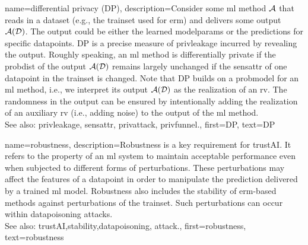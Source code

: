 {name={differential privacy (DP)},
  description={Consider some \gls{ml} method $\mathcal{A}$ 
  	that reads in a \gls{dataset} (e.g., the \gls{trainset} 
  	used for \gls{erm}) and delivers some output $\mathcal{A}(\mathcal{D})$. The output 
  	could be either the learned \glspl{modelparam} or the \glspl{prediction} for specific \glspl{datapoint}. 
  	DP is a precise measure of \gls{privleakage} incurred by revealing the 
  	output. Roughly speaking, an \gls{ml} method is differentially private if the \gls{probdist} 
  	of the output $\mathcal{A}(\mathcal{D})$ remains largely unchanged if the \gls{sensattr} 
  	of one \gls{datapoint} in the \gls{trainset} is changed. Note that DP 
  	builds on a \gls{probmodel} for an \gls{ml} method, i.e., we interpret its output $\mathcal{A}(\mathcal{D})$ 
  	as the \gls{realization} of an \gls{rv}. The randomness in the output can be ensured 
  	by intentionally adding the \gls{realization} of an auxiliary \gls{rv} (i.e., adding noise) to 
  	the output of the \gls{ml} method.
				\\ 
	See also: \gls{privleakage}, \gls{sensattr}, \gls{privattack}, \gls{privfunnel}.}, 
  first={DP}, 
  text={DP} 
}

{name={robustness},
	description={Robustness is a key requirement for \gls{trustAI}. It
		refers to the property of an \gls{ml} system to maintain acceptable performance even when 
		subjected to different forms of perturbations. These perturbations may affect the \glspl{feature} 
		of a \gls{datapoint} in order to manipulate the \gls{prediction} delivered by a trained \gls{ml} \gls{model}. 
		Robustness also includes the \gls{stability} of \gls{erm}-based methods against perturbations 
		of the \gls{trainset}. Such perturbations can occur within \gls{datapoisoning} \glspl{attack}. 
		\\ 
		See also: \gls{trustAI},\gls{stability},\gls{datapoisoning}, \gls{attack}.}, 
	first={robustness}, 
	text={robustness} 
}


